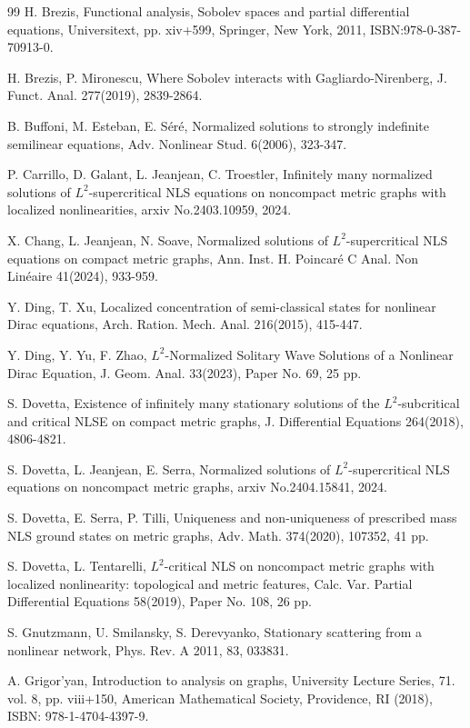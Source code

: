 \documentclass[11pt]{amsart}
\numberwithin{equation}{section}
\begin{document}
\begin{thebibliography}{99}
H. Brezis,
Functional analysis, Sobolev spaces and partial differential equations,
Universitext, pp. xiv+599, Springer, New York, 2011, ISBN:978-0-387-70913-0.

H. Brezis, P. Mironescu, Where Sobolev interacts with Gagliardo-Nirenberg,
J. Funct. Anal. 277(2019), 2839-2864.

B. Buffoni, M. Esteban, E. S\'er\'e,
Normalized solutions to strongly indefinite semilinear equations,
Adv. Nonlinear Stud. 6(2006), 323-347.

P. Carrillo, D. Galant, L. Jeanjean, C. Troestler, Infinitely many normalized solutions of $L^2$-supercritical NLS equations on noncompact metric graphs with localized nonlinearities, arxiv No.2403.10959, 2024.

X. Chang, L. Jeanjean, N. Soave, Normalized solutions of $L^2$-supercritical NLS equations on compact metric graphs, Ann. Inst. H. Poincar\'{e} C Anal. Non Lin\'{e}aire 41(2024), 933-959.

Y. Ding, T. Xu, Localized concentration of semi-classical states for nonlinear Dirac equations, Arch. Ration. Mech. Anal. 216(2015), 415-447.

Y. Ding, Y. Yu, F. Zhao, $L^2$-Normalized Solitary Wave Solutions of a Nonlinear Dirac Equation, J. Geom. Anal. 33(2023), Paper No. 69, 25 pp.

S. Dovetta, Existence of infinitely many stationary solutions of the $L^2$-subcritical and critical NLSE on compact metric graphs, J. Differential Equations 264(2018), 4806-4821.

S. Dovetta, L. Jeanjean, E. Serra, Normalized solutions of $L^2$-supercritical NLS equations on noncompact metric graphs, arxiv No.2404.15841, 2024.

S. Dovetta, E. Serra, P. Tilli, Uniqueness and non-uniqueness of prescribed mass NLS ground states on metric graphs, Adv. Math. 374(2020), 107352, 41 pp.

S. Dovetta, L. Tentarelli, $L^2$-critical NLS on noncompact metric graphs with localized nonlinearity: topological and metric features, Calc. Var. Partial Differential Equations 58(2019), Paper No. 108, 26 pp.

S. Gnutzmann, U. Smilansky, S. Derevyanko, Stationary scattering from a nonlinear network, Phys. Rev. A 2011, 83, 033831.

 A. Grigor'yan,  Introduction to analysis on graphs, University Lecture Series, 71. vol. 8, pp. viii+150, American Mathematical Society, Providence, RI (2018), ISBN: 978-1-4704-4397-9.


\end{thebibliography}
\end{document}
